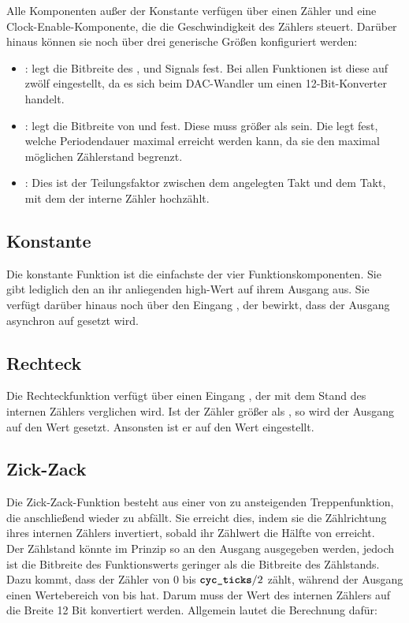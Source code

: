 Alle Komponenten außer der Konstante verfügen über einen Zähler und eine Clock-Enable-Komponente, die die Geschwindigkeit des Zählers steuert.
Darüber hinaus können sie noch über drei generische Größen konfiguriert werden:

\begin{itemize}
\item {}: legt die Bitbreite des ,  und  Signals fest.
Bei allen Funktionen ist diese auf zwölf eingestellt, da es sich beim DAC-Wandler um einen 12-Bit-Konverter handelt.
\item {}: legt die Bitbreite von  und  fest.
  Diese muss größer als  sein.
  Die  legt fest, welche Periodendauer maximal erreicht werden kann, da sie den maximal möglichen Zählerstand begrenzt.
\item {}: Dies ist der Teilungsfaktor zwischen dem angelegten Takt und dem Takt, mit dem der interne Zähler hochzählt.
\end{itemize}


\subsection{Konstante}   \label{Comp:Func:Const}
Die konstante Funktion ist die einfachste der vier Funktionskomponenten.
Sie gibt lediglich den an ihr anliegenden high-Wert auf ihrem Ausgang aus.
Sie verfügt darüber hinaus noch über den Eingang , der bewirkt, dass der Ausgang asynchron auf  gesetzt wird.

\subsection{Rechteck}   \label{Comp:Func:Square}
Die Rechteckfunktion verfügt über einen Eingang , der mit dem Stand des internen Zählers verglichen wird.
Ist der Zähler größer als , so wird der Ausgang auf den Wert  gesetzt.
Ansonsten ist er auf den Wert  eingestellt.

\subsection{Zick-Zack}  \label{Comp:Func:ZigZag}
Die Zick-Zack-Funktion besteht aus einer von  zu  ansteigenden Treppenfunktion, die anschließend wieder zu  abfällt.
Sie erreicht dies, indem sie die Zählrichtung  ihres internen Zählers invertiert, sobald ihr Zählwert  die Hälfte von  erreicht. \\
Der Zählstand könnte im Prinzip so an den Ausgang ausgegeben werden, jedoch ist die Bitbreite des Funktionswerts geringer als die Bitbreite des Zählstands.
Dazu kommt, dass der Zähler von 0 bis $\textbf{\texttt{cyc\_ticks}} / 2$ zählt, während der Ausgang einen Wertebereich von  bis  hat.
Darum muss der Wert des internen Zählers auf die Breite 12 Bit konvertiert werden.
Allgemein lautet die Berechnung dafür:

